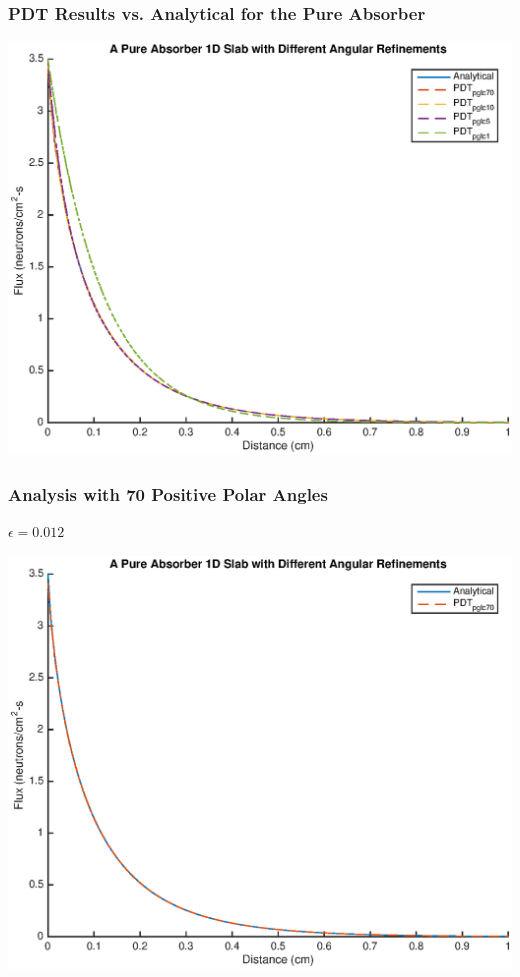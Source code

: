 \documentclass[]{beamer}
\begin{document}
\begin{frame}[t]\frametitle{PDT Results vs. Analytical for the Pure Absorber}
\centering
\includegraphics[scale = 0.5]{figures/PureAbsorberAllAngles.eps}
\end{frame}

\begin{frame}[t]\frametitle{Analysis with 70 Positive Polar Angles}
\begin{minipage}{0.15\textwidth}
\begin{footnotesize}
$\epsilon = 0.012$
\end{footnotesize}
\end{minipage}
\begin{minipage}{0.8\textwidth}
\centering
\includegraphics[scale = 0.5]{figures/PureAbsorberBestangle.eps}
\end{minipage}
\end{frame}
\end{document}
